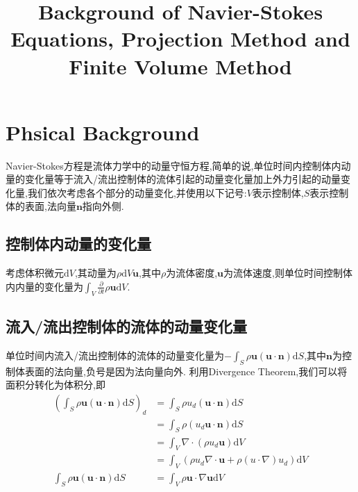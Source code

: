 \documentclass[12pt,halfline,a4paper]{ouparticle}
\begin{document}
\title{Background of Navier-Stokes Equations, Projection Method and Finite Volume Method} 

\author{%
}
\date{}




\maketitle
\tableofcontents
\newpage




\section{Phsical Background}
Navier-Stokes方程是流体力学中的动量守恒方程,简单的说,单位时间内控制体内动量的变化量等于流入/流出控制体的流体引起的动量变化量加上外力引起的动量变化量,我们依次考虑各个部分的动量变化,并使用以下记号:$V$表示控制体,$S$表示控制体的表面,法向量$\mathbf{n}$指向外侧.
\subsection*{控制体内动量的变化量}
考虑体积微元$\text{d} V$,其动量为$\rho \text{d} V \boldsymbol{u}$,其中$\rho$为流体密度,$\boldsymbol{u}$为流体速度,则单位时间控制体内内量的变化量为$\int_{V}\frac{\partial}{\partial t}\rho \boldsymbol{u} \text{d} V$.
\subsection*{流入/流出控制体的流体的动量变化量}
单位时间内流入/流出控制体的流体的动量变化量为$-\int_{S} \rho \boldsymbol{u} (\boldsymbol{u} \cdot \mathbf{n}) \text{d} S$,其中$\mathbf{n}$为控制体表面的法向量,负号是因为法向量向外.
\newline
利用Divergence Theorem,我们可以将面积分转化为体积分,即
\begin{equation}\label{eq:convection}
    \begin{aligned}
        (\int_{S} \rho \boldsymbol{u} (\boldsymbol{u} \cdot \mathbf{n}) \text{d} S)_d &= \int_{S} \rho u_d (\boldsymbol{u} \cdot \mathbf{n}) \text{d} S
        \\
        &=\int_{S} \rho  (u_d\boldsymbol{u} \cdot \mathbf{n}) \text{d} S\\
        &=\int_{V} \nabla \cdot (\rho u_d \boldsymbol{u}) \text{d} V\\
        &=\int_{V} (\rho u_d\nabla \cdot \boldsymbol{u}+ \rho (u\cdot\nabla)u_d )\text{d} V\\
        \int_{S} \rho \boldsymbol{u} (\boldsymbol{u} \cdot \mathbf{n}) \text{d} S &= \int_{V} \rho \boldsymbol{u} \cdot \nabla \boldsymbol{u} \text{d} V 
\end{aligned}
\end{equation}
\end{document}
